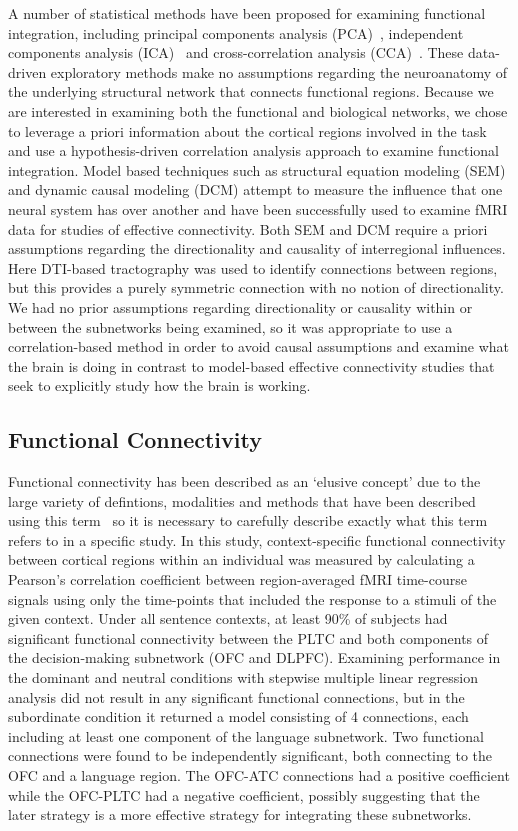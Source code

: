 A number of statistical methods have been proposed for examining functional integration, including principal components analysis (PCA)~\cite{Kadosh2008,Friston2000}, independent components analysis (ICA)~\cite{Greicius2007,Calhoun2008} and cross-correlation analysis (CCA)~\cite{Ma2007,Arfanakis2000}. These data-driven exploratory methods make no assumptions regarding the neuroanatomy of the underlying structural network that connects functional regions. Because we are interested in examining both the functional and biological networks, we chose to leverage a priori information about the cortical regions involved in the task and use a hypothesis-driven correlation analysis approach to examine functional integration. Model based techniques such as structural equation modeling (SEM) and dynamic causal modeling (DCM) attempt to measure the influence that one neural system has over another and have been successfully used to examine fMRI data for studies of effective connectivity. Both SEM and DCM require a priori assumptions regarding the directionality and causality of interregional influences. Here DTI-based tractography was used to identify connections between regions, but this provides a purely symmetric connection with no notion of directionality. We had no prior assumptions regarding directionality or causality within or between the subnetworks being examined, so it was appropriate to use a correlation-based method in order to avoid causal assumptions and examine what the brain is doing in contrast to model-based effective connectivity studies that seek to explicitly study how the brain is working. 

\subsection{Functional Connectivity}
Functional connectivity has been described as an `elusive concept' due to the large variety of defintions, modalities and methods that have been described using this term~\cite{Horwitz2003} so it is necessary to carefully describe exactly what this term refers to in a specific study. In this study, context-specific functional connectivity between cortical regions within an individual was measured by calculating a Pearson's correlation coefficient between region-averaged fMRI time-course signals using only the time-points that included the response to a stimuli of the given context. Under all sentence contexts, at least 90\% of subjects had significant functional connectivity between the PLTC and both components of the decision-making subnetwork (OFC and DLPFC). Examining performance in the dominant and neutral conditions with stepwise multiple linear regression analysis did not result in any significant functional connections, but in the subordinate condition it returned a model consisting of 4 connections, each including at least one component of the language subnetwork. Two functional connections were found to be independently significant, both connecting to the OFC and a language region. The OFC-ATC connections had a positive coefficient while the OFC-PLTC had a negative coefficient, possibly suggesting that the later strategy is a more effective strategy for integrating these subnetworks.

